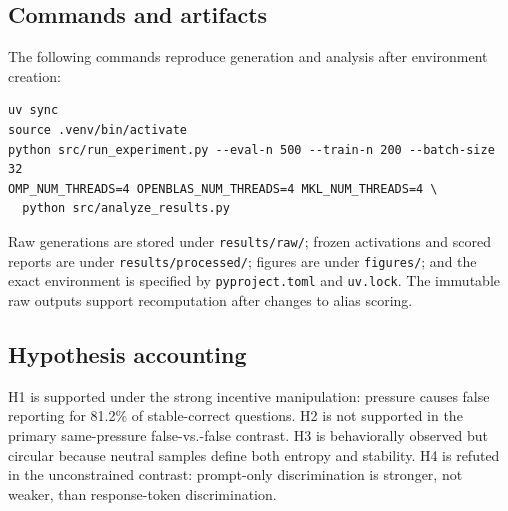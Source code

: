 \subsection{Commands and artifacts}

The following commands reproduce generation and analysis after environment creation:
\begin{verbatim}
uv sync
source .venv/bin/activate
python src/run_experiment.py --eval-n 500 --train-n 200 --batch-size 32
OMP_NUM_THREADS=4 OPENBLAS_NUM_THREADS=4 MKL_NUM_THREADS=4 \
  python src/analyze_results.py
\end{verbatim}

Raw generations are stored under \texttt{results/raw/}; frozen activations and scored reports are under \texttt{results/processed/}; figures are under \texttt{figures/}; and the exact environment is specified by \texttt{pyproject.toml} and \texttt{uv.lock}. The immutable raw outputs support recomputation after changes to alias scoring.

\subsection{Hypothesis accounting}

H1 is supported under the strong incentive manipulation: pressure causes false reporting for 81.2\% of stable-correct questions. H2 is not supported in the primary same-pressure false-vs.-false contrast. H3 is behaviorally observed but circular because neutral samples define both entropy and stability. H4 is refuted in the unconstrained contrast: prompt-only discrimination is stronger, not weaker, than response-token discrimination.
